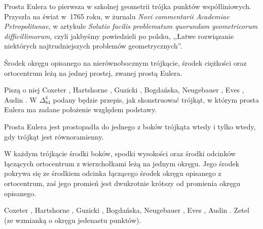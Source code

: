 %

Prosta Eulera to pierwsza w szkolnej geometrii trójka punktów współliniowych.
Przyszła na świat w~1765 roku, w żurnalu \emph{Novi commentarii Academiae Petropolitanae}, w artykule \emph{Solutio facilis problematum quorundam geometricorum difficillimorum}, czyli jakbyśmy powiedzieli po polsku, ,,Łatwe rozwiązanie niektórych najtrudniejszych problemów geometrycznych''.

\begin{proposition}
	\label{prosta_eulera}
	Środek okręgu opisanego na nierównobocznym trójkącie, środek ciężkości oraz ortocentrum leżą na jednej prostej, zwanej prostą Eulera.
\end{proposition}

Piszą o niej
Coxeter \cite[s. 32, 33]{coxeter_1967},
Hartshorne \cite[s. 54, 55]{hartshorne2000},
Guzicki \cite[s. 222]{guzicki_2021},
Bogdańska, Neugebauer \cite[s. 84]{neugebauer_2018},
Eves \cite[s. 109]{eves1_1972},
Audin \cite[s. 61]{audin_2003}.
W $\Delta_{84}^{4}$ podany będzie przepis, jak skonstruować trójkąt, w którym prosta Eulera ma zadane położenie względem podstawy.

\begin{proposition}
	Prosta Eulera jest prostopadła do jednego z boków trójkąta wtedy i tylko wtedy, gdy trójkąt jest równoramienny.
\end{proposition}

\begin{proposition}
\label{okrag_dziewieciu_punktow}%
	W każdym trójkącie środki boków, spodki wysokości oraz środki odcinków łączących ortocentrum z wierzchołkami leżą na jednym okręgu.
	Jego środek pokrywa się ze środkiem odcinka łączącego środek okręgu opisanego z ortocentrum, zaś jego promień jest dwukrotnie krótszy od promienia okręgu opisanego.
\end{proposition}


Coxeter \cite[s. 34, 35, 88]{coxeter_1967},
Hartshorne \cite[s. 57, 60]{hartshorne2000},
Guzicki \cite[s. 223]{guzicki_2021},
Bogdańska, Neugebauer \cite[s. 85, 86]{neugebauer_2018},
Eves \cite[s. 109]{eves1_1972},
Audin \cite[s. 62]{audin_2003}.
Zetel \cite[s. 59, 85]{zetel_2020} (ze wzmianką o okręgu jedenastu punktów).

